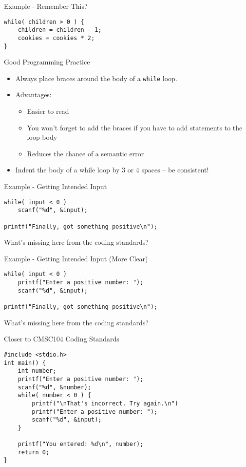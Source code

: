 \documentclass[graphics]{beamer}
\begin{document}
\begin{frame}[fragile]{Example - Remember This?}
\begin{verbatim}
while( children > 0 ) {
    children = children - 1;
    cookies = cookies * 2;
}
\end{verbatim}
\end{frame}

\begin{frame}{Good Programming Practice}
    \begin{itemize}
        \item Always place braces around the body of a \texttt{while} loop.
        \item Advantages:
        \begin{itemize}
            \item Easier to read
            \item You won't forget to add the braces if you have to add statements to the loop body
            \item Reduces the chance of a semantic error
        \end{itemize}
        \item Indent the body of a while loop by 3 or 4 spaces -- be consistent!
    \end{itemize}
\end{frame}

\begin{frame}[fragile]{Example - Getting Intended Input}
\begin{verbatim}
while( input < 0 )
    scanf("%d", &input);

printf("Finally, got something positive\n");
\end{verbatim}

\footnotesize What's missing here from the coding standards?
\end{frame}

\begin{frame}[fragile]{Example - Getting Intended Input (More Clear)}
\begin{verbatim}
while( input < 0 )
    printf("Enter a positive number: ");
    scanf("%d", &input);

printf("Finally, got something positive\n");
\end{verbatim}

\footnotesize What's missing here from the coding standards?
\end{frame}

\begin{frame}[fragile]{Closer to CMSC104 Coding Standards}
\begin{verbatim}
#include <stdio.h>
int main() {
    int number;
    printf("Enter a positive number: ");
    scanf("%d", &number);
    while( number < 0 ) {
        printf("\nThat's incorrect. Try again.\n")
        printf("Enter a positive number: ");
        scanf("%d", &input);
    }

    printf("You entered: %d\n", number);
    return 0;
}
\end{verbatim}
\end{frame}
\end{document}

